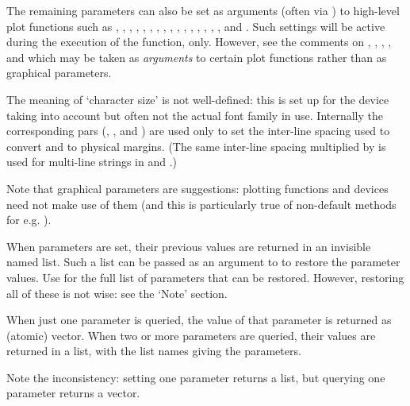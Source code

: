 \begin{Details}
\begin{itemize}
\end{itemize}

The remaining parameters can also be set as arguments (often via
) to high-level plot functions such as
, ,
, , ,
, , ,
, , ,
, , ,
, , 
and .  Such settings will be active during the
execution of the function, only.  However, see the comments on
, , , ,  and
 which may be taken as \emph{arguments} to certain plot
functions rather than as graphical parameters.

The meaning of `character size' is not well-defined: this is
set up for the device taking  into account but often
not the actual font family in use.  Internally the corresponding pars
(, ,  and ) are used only to
set the inter-line spacing used to convert  and 
to physical margins.  (The same inter-line spacing multiplied by
 is used for multi-line strings in  and
.)

Note that graphical parameters are suggestions: plotting functions and
devices need not make use of them (and this is particularly true of
non-default methods for e.g. ).
\end{Details}
%
\begin{Value}
When parameters are set, their previous values are returned in an
invisible named list.  Such a list can be passed as an argument to
 to restore the parameter values.  Use  for the full list of parameters that can be restored.
However, restoring all of these is not wise: see the `Note'
section.

When just one parameter is queried, the value of that parameter
is returned as (atomic) vector.  When two or more parameters are
queried, their values are returned in a list, with the list names
giving the parameters.

Note the inconsistency: setting one parameter returns a list, but
querying one parameter returns a vector.
\end{Value}
